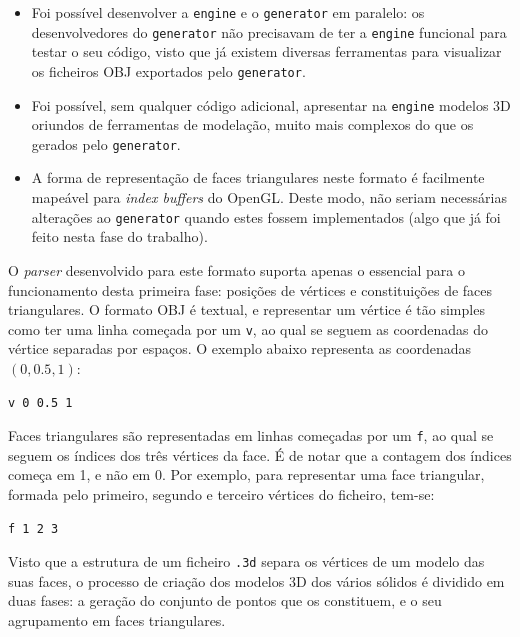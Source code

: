\documentclass[12pt, a4paper]{article}
\begin{document}
\begin{itemize}
    \item Foi possível desenvolver a \texttt{engine} e o \texttt{generator} em paralelo: os
        desenvolvedores do \texttt{generator} não precisavam de ter a \texttt{engine} funcional para
        testar o seu código, visto que já existem diversas ferramentas para visualizar os ficheiros
        OBJ exportados pelo \texttt{generator}.

    \item Foi possível, sem qualquer código adicional, apresentar na \texttt{engine} modelos 3D
        oriundos de ferramentas de modelação, muito mais complexos do que os gerados pelo
        \texttt{generator}.

    \item A forma de representação de faces triangulares neste formato é facilmente mapeável para
        \emph{index buffers} do OpenGL. Deste modo, não seriam necessárias alterações ao
        \texttt{generator} quando estes fossem implementados (algo que já foi feito nesta fase do
        trabalho).
\end{itemize}

O \emph{parser} desenvolvido para este formato suporta apenas o essencial para o funcionamento desta
primeira fase: posições de vértices e constituições de faces triangulares. O formato OBJ é textual,
e representar um vértice é tão simples como ter uma linha começada por um \texttt{v}, ao qual se
seguem as coordenadas do vértice separadas por espaços. O exemplo abaixo representa as coordenadas
$(0, 0.5, 1)$:

\begin{verbatim}
v 0 0.5 1
\end{verbatim}

Faces triangulares são representadas em linhas começadas por um \texttt{f}, ao qual se seguem os
índices dos três vértices da face. É de notar que a contagem dos índices começa em 1, e não em 0.
Por exemplo, para representar uma face triangular, formada pelo primeiro, segundo e terceiro
vértices do ficheiro, tem-se:

\begin{verbatim}
f 1 2 3
\end{verbatim}

Visto que a estrutura de um ficheiro \texttt{.3d} separa os vértices de um modelo das suas faces, o
processo de criação dos modelos 3D dos vários sólidos é dividido em duas fases: a geração do
conjunto de pontos que os constituem, e o seu agrupamento em faces triangulares.
\end{document}
